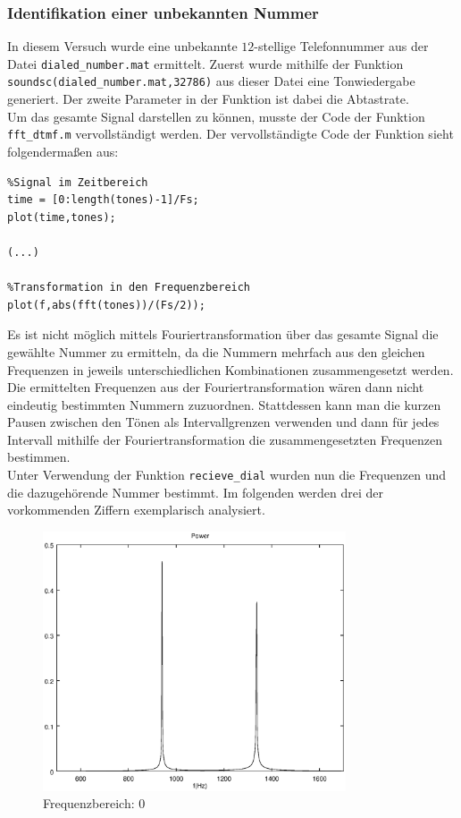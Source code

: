 \documentclass[a4paper]{article}
\begin{document}
\subsubsection{Identifikation einer unbekannten Nummer}
In diesem Versuch wurde eine unbekannte $12$-stellige Telefonnummer aus der Datei \lstinline{dialed_number.mat} ermittelt. 
Zuerst wurde mithilfe der Funktion \lstinline{soundsc(dialed_number.mat,32786)} aus dieser Datei eine Tonwiedergabe generiert. Der zweite Parameter in der Funktion ist dabei die Abtastrate.\\

Um das gesamte Signal darstellen zu können, musste der Code der Funktion \lstinline{fft_dtmf.m} vervollständigt werden.
Der vervollständigte Code der Funktion sieht folgendermaßen aus:

\begin{lstlisting}
%Signal im Zeitbereich
time = [0:length(tones)-1]/Fs;
plot(time,tones);

(...)

%Transformation in den Frequenzbereich
plot(f,abs(fft(tones))/(Fs/2));
\end{lstlisting}

Es ist nicht möglich mittels Fouriertransformation über das gesamte Signal die gewählte Nummer zu ermitteln, da die Nummern mehrfach aus den gleichen Frequenzen in jeweils unterschiedlichen Kombinationen zusammengesetzt werden.
Die ermittelten Frequenzen aus der Fouriertransformation wären dann nicht eindeutig bestimmten Nummern zuzuordnen.
Stattdessen kann man die kurzen Pausen zwischen den Tönen als Intervallgrenzen verwenden und dann für jedes Intervall mithilfe der Fouriertransformation die zusammengesetzten Frequenzen bestimmen.\\

Unter Verwendung der Funktion \lstinline{recieve_dial} wurden nun die Frequenzen und die dazugehörende Nummer bestimmt.
Im folgenden werden drei der vorkommenden Ziffern exemplarisch analysiert.

\begin{figure}[H]
    \centering
    \includegraphics[width=0.8\textwidth, keepaspectratio]{nummer_0_fft.eps}
    \caption{Frequenzbereich: 0}
    \label{fig:nummer-0-fft}
\end{figure}
\end{document}
